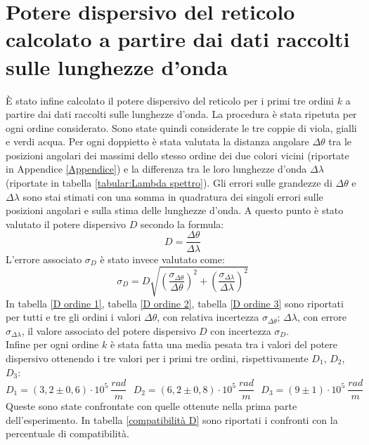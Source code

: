 \documentclass{article}
\begin{document}
    \section{Potere dispersivo del reticolo calcolato a partire dai dati raccolti sulle lunghezze d'onda}
        
        È stato infine calcolato il potere dispersivo del reticolo per i primi tre ordini $k$ a partire dai dati raccolti sulle lunghezze d'onda.
        La procedura è stata ripetuta per ogni ordine considerato. Sono state quindi considerate le tre coppie di viola, gialli e verdi acqua. 
        Per ogni doppietto è stata valutata la distanza angolare $\Delta \theta$ tra le posizioni angolari dei massimi dello stesso ordine dei due colori vicini 
        (riportate in Appendice \ref{Appendice}) e la differenza tra le loro lunghezze d'onda $\Delta \lambda$ (riportate in tabella \ref{tabular:Lambda spettro}). 
        Gli errori sulle grandezze di $\Delta \theta$ e $\Delta \lambda$ sono stai stimati con una somma in quadratura dei singoli errori sulle posizioni angolari e
        sulla stima delle lunghezze d'onda. A questo punto è stato valutato il potere dispersivo $D$ secondo la formula: \[D = \frac{\Delta \theta}{\Delta \lambda}\]
        L'errore associato $\sigma_D$ è stato invece valutato come:
        \[\sigma_D = D \sqrt{(\frac{\sigma_{\Delta \theta}}{\Delta \theta})^2 + (\frac{\sigma_{\Delta \lambda}}{\Delta \lambda})^2}\]
        In tabella \ref{D ordine 1}, tabella \ref{D ordine 2}, tabella \ref{D ordine 3} sono riportati per tutti e tre gli ordini i valori $\Delta \theta$,
        con relativa incertezza $\sigma_{\Delta \theta}$; $\Delta \lambda$, con errore $\sigma_{\Delta \lambda}$, il valore associato del potere dispersivo $D$ 
        con incertezza $\sigma_D$. \\

        Infine per ogni ordine $k$ è stata fatta una media pesata tra i valori del potere dispersivo ottenendo i tre valori per i primi tre ordini, 
        rispettivamente $D_1$, $D_2$, $D_3$:
        \[D_1 = (3,2 \pm 0,6) \cdot 10^{5} \ \frac{rad}{m}\ \ \ 
        D_2 = (6,2 \pm 0,8)\cdot 10^{5}\  \frac{rad}{m}\ \ \ 
        D_3 = (9 \pm 1)\cdot 10^{5}\  \frac{rad}{m}\]
        Queste sono state confrontate con quelle ottenute nella prima parte dell'esperimento. 
        In tabella \ref{compatibilità D} sono riportati i confronti con la percentuale di compatibilità. 
        
\end{document}
